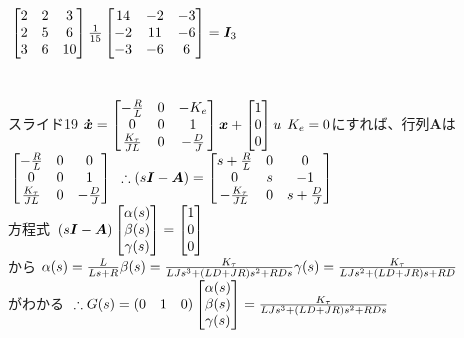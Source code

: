 \documentclass[12pt,a4paper]{article}
\begin{document}
$\\
\begin{bmatrix}
2 & 2 & 3\\
2 & 5 & 6\\
3 & 6 & 10
\end{bmatrix}
\frac{1}{15}
\begin{bmatrix}
14 & -2 & -3\\
-2 & 11 & -6\\
-3 & -6 & 6\\
\end{bmatrix}=\bm{I}_3$
\\
\\
\\
スライド19
$\\\bm{\dot{x}}=
\begin{bmatrix}
-\frac{R}{L} & 0 & -K_e\\
0 & 0 & 1\\
\frac{K_\tau}{JL} & 0 & -\frac{D}{J}
\end{bmatrix}\bm{x}+
\begin{bmatrix}
1\\
0\\
0\\
\end{bmatrix}u$
$\\K_e=0$にすれば、行列$\bm{A}$は
$\\
\begin{bmatrix}
-\frac{R}{L} & 0 & 0\\
0 & 0 & 1\\
\frac{K_\tau}{JL} & 0 & -\frac{D}{J}
\end{bmatrix}$
$\\\therefore \left(s\bm{I}-\bm{A}\right)=
\begin{bmatrix}
s+\frac{R}{L} & 0 & 0\\
0 & s & -1\\
-\frac{K_\tau}{JL} & 0 & s+\frac{D}{J}
\end{bmatrix}$
\\
方程式
$\\\left(s\bm{I}-\bm{A}\right)
\begin{bmatrix}
\alpha(s)\\
\beta(s)\\
\gamma(s)
\end{bmatrix}=
\begin{bmatrix}
1\\
0\\
0
\end{bmatrix}$
\\
から
$\\\alpha(s)=\frac{L}{Ls+R}
\\\beta(s)=\frac{K_\tau}{LJs^3+(LD+JR)s^2+RDs}
\\\gamma(s)=\frac{K_\tau}{LJs^2+(LD+JR)s+RD}$
\\
がわかる
$\\\therefore G(s)=(0\quad 1\quad 0)
\begin{bmatrix}
\alpha(s)\\
\beta(s)\\
\gamma(s)
\end{bmatrix}=\frac{K_\tau}{LJs^3+(LD+JR)s^2+RDs}$
\newpage
\end{document}
